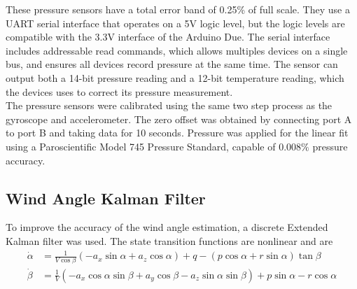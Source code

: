 These pressure sensors have a total error band of 0.25\% of full scale. They use a UART serial interface that operates on a 5V logic level, but the logic levels are compatible with the 3.3V interface of the Arduino Due. The serial interface includes addressable read commands, which allows multiples devices on a single bus, and ensures all devices record pressure at the same time. The sensor can output both a 14-bit pressure reading and a 12-bit temperature reading, which the devices uses to correct its pressure measurement.\\

The pressure sensors were calibrated using the same two step process as the gyroscope and accelerometer. The zero offset was obtained by connecting port A to port B and taking data for 10 seconds. Pressure was applied for the linear fit using a Paroscientific Model 745 Pressure Standard, capable of $0.008\%$ pressure accuracy\cite{pressureStandard}.

\subsection{Wind Angle Kalman Filter}

To improve the accuracy of the wind angle estimation, a discrete Extended Kalman filter was used. The state transition functions are nonlinear and are
\begin{align}
\dot{\alpha} & = \frac{1}{V\cos\beta}(-a_x\sin\alpha+a_z\cos\alpha)+q-(p\cos\alpha+r\sin\alpha)\tan\beta\\
\dot{\beta} &=\frac{1}{V}(-a_x\cos\alpha\sin\beta+a_y\cos\beta-a_z\sin\alpha\sin\beta)+p\sin\alpha-r\cos\alpha
\end{align}

